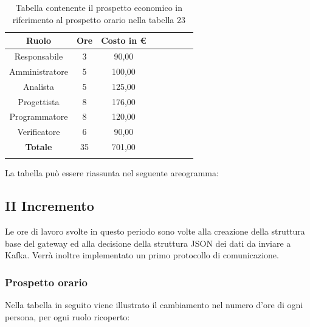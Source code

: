 			\begin{longtable}{|c|c|c|c|c|c|c|c}
				\hline
				\rowcolor{lighter-grayer}
				\textbf{Ruolo} & \textbf{Ore} & \textbf{Costo in €} \\
				\hline
				\endfirsthead
				\hline
			Responsabile 	    & 3 & 90,00\\
			\hline 
			\hline
			Amministratore	  & 5 & 100,00\\
			\hline
			\hline
			Analista 				& 5 & 125,00\\
			\hline
			\hline
			Progettista 		  & 8 & 176,00\\
			\hline
			\hline
			Programmatore 	 & 8 & 120,00\\
			\hline
			\hline
			Verificatore 		  & 6 & 90,00\\
			\hline
			\textbf{Totale} 	& 35 & 701,00\\
			\hline
				
				\caption{Tabella contenente il prospetto economico in riferimento al prospetto orario nella tabella 23}
			\end{longtable}
			\pagebreak
			
			La tabella può essere riassunta nel seguente areogramma:
		

		\subsection{II Incremento}
		Le ore di lavoro svolte in questo periodo sono volte alla creazione della struttura base del gateway ed alla decisione della struttura JSON dei dati da inviare a Kafka. Verrà inoltre implementato un primo protocollo di comunicazione.
		\subsubsection{Prospetto orario}
			Nella tabella in seguito viene illustrato il cambiamento nel numero d'ore di ogni persona, per ogni ruolo ricoperto:
			
